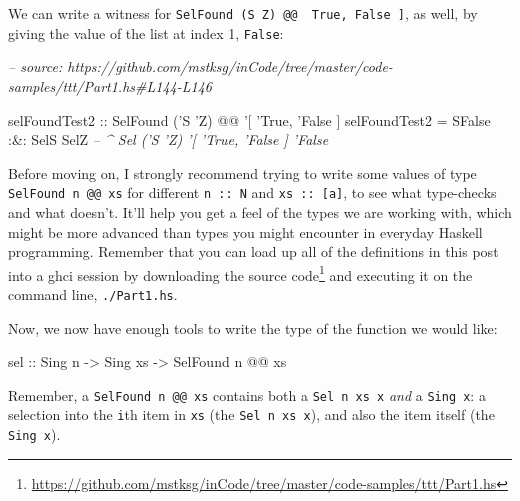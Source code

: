 \documentclass[]{article}
\newenvironment{Shaded}{}{}
\newcommand{\CommentTok}[1]{\textcolor[rgb]{0.38,0.63,0.69}{\textit{#1}}}
\newcommand{\DataTypeTok}[1]{\textcolor[rgb]{0.56,0.13,0.00}{#1}}
\newcommand{\FunctionTok}[1]{\textcolor[rgb]{0.02,0.16,0.49}{#1}}
\newcommand{\NormalTok}[1]{#1}
\newcommand{\OtherTok}[1]{\textcolor[rgb]{0.00,0.44,0.13}{#1}}
\renewcommand{\href}[2]{#2\footnote{\url{#1}}}
\begin{document}
We can write a witness for
\texttt{SelFound\ (\textquotesingle{}S\ \textquotesingle{}Z)\ @@\ \textquotesingle{}{[}\ \textquotesingle{}True,\ \textquotesingle{}False\ {]}},
as well, by giving the value of the list at index 1,
\texttt{\textquotesingle{}False}:

\begin{Shaded}
\begin{Highlighting}[]
\CommentTok{-- source: https://github.com/mstksg/inCode/tree/master/code-samples/ttt/Part1.hs#L144-L146}

\OtherTok{selFoundTest2 ::} \DataTypeTok{SelFound}\NormalTok{ ('}\DataTypeTok{S}\NormalTok{ '}\DataTypeTok{Z}\NormalTok{) }\FunctionTok{@@}\NormalTok{ '[ '}\DataTypeTok{True}\NormalTok{, '}\DataTypeTok{False}\NormalTok{ ]}
\NormalTok{selFoundTest2 }\FunctionTok{=} \DataTypeTok{SFalse} \FunctionTok{:&:} \DataTypeTok{SelS} \DataTypeTok{SelZ}
                        \CommentTok{-- ^ Sel ('S 'Z) '[ 'True, 'False ] 'False}
\end{Highlighting}
\end{Shaded}

Before moving on, I strongly recommend trying to write some values of type
\texttt{SelFound\ n\ @@\ xs} for different \texttt{n\ ::\ N} and
\texttt{xs\ ::\ {[}a{]}}, to see what type-checks and what doesn't. It'll help
you get a feel of the types we are working with, which might be more advanced
than types you might encounter in everyday Haskell programming. Remember that
you can load up all of the definitions in this post into a ghci session by
downloading
\href{https://github.com/mstksg/inCode/tree/master/code-samples/ttt/Part1.hs}{the
source code} and executing it on the command line, \texttt{./Part1.hs}.

Now, we now have enough tools to write the type of the function we would like:

\begin{Shaded}
\begin{Highlighting}[]
\OtherTok{sel ::} \DataTypeTok{Sing}\NormalTok{ n}
    \OtherTok{->} \DataTypeTok{Sing}\NormalTok{ xs}
    \OtherTok{->} \DataTypeTok{SelFound}\NormalTok{ n }\FunctionTok{@@}\NormalTok{ xs}
\end{Highlighting}
\end{Shaded}

Remember, a \texttt{SelFound\ n\ @@\ xs} contains both a \texttt{Sel\ n\ xs\ x}
\emph{and} a \texttt{Sing\ x}: a selection into the \texttt{i}th item in
\texttt{xs} (the \texttt{Sel\ n\ xs\ x}), and also the item itself (the
\texttt{Sing\ x}).
\end{document}
